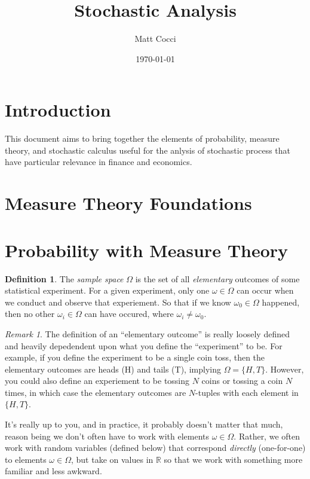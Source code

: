 \documentclass[a4paper,12pt]{article}
\author{Matt Cocci}
\title{Stochastic Analysis}
\date{\today}
\theoremstyle{plain}
\theoremstyle{definition}
\newtheorem{defn}[thm]{Definition}
\theoremstyle{remark}
\newtheorem*{rmk}{Remark}
\begin{document}
\maketitle
\tableofcontents

\clearpage

\section{Introduction}

This document aims to bring together the elements of probability,
measure theory, and stochastic calculus useful for the anlysis of
stochastic process that have particular relevance in finance and
economics.

\section{Measure Theory Foundations}

\section{Probability with Measure Theory}

\begin{defn}
The \emph{sample space} $\Omega$ is the set of all \emph{elementary}
outcomes of some statistical experiment. For a given experiment, only
one $\omega \in \Omega$ can occur when we conduct and observe that
experiement.  So that if we know $\omega_0 \in \Omega$ happened, then no
other $\omega_i \in \Omega$ can have occured, where
$\omega_i\neq\omega_0$.
\end{defn}
\begin{rmk}
The definition of an ``elementary outcome'' is really loosely defined
and heavily depedendent upon what you define the ``experiment'' to be.
For example, if you define the experiment to be a single coin toss, then
the elementary outcomes are heads (H) and tails (T), implying $\Omega =
\{H,T\}$. However, you could also define an experiement to be tossing
$N$ coins or tossing a coin $N$ times, in which case the elementary
outcomes are $N$-tuples with each element in $\{H,T\}$.

It's really up to you, and in practice, it probably doesn't matter that
much, reason being we don't often have to work with elements $\omega\in
\Omega$. Rather, we often work with random variables (defined below)
that correspond \emph{directly} (one-for-one) to elements
$\omega\in\Omega$, but take on values in $\mathbb{R}$ so that we work
with something more familiar and less awkward.
\end{rmk}
\end{document}
